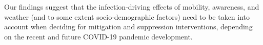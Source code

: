 \documentclass[10pt,letterpaper]{article}
\begin{document}
Our findings suggest that the infection-driving effects of mobility, awareness, and weather (and to some extent socio-demographic factors) need to be taken into account when deciding for mitigation and suppression interventions, depending on the recent and future COVID-19 pandemic development.


%
%
\end{document}
